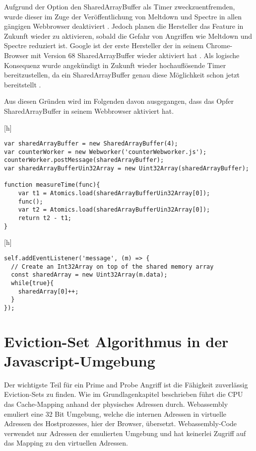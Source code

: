 Aufgrund der Option den SharedArrayBuffer als Timer zweckzuentfremden, wurde dieser im Zuge der Veröffentlichung von Meltdown und Spectre in allen gängigen Webbrowser deaktiviert \cite{FirefoxSharedArrayBuffer}. Jedoch planen die Hersteller das Feature in Zukunft wieder zu aktivieren, sobald die Gefahr von Angriffen wie Meltdown und Spectre reduziert ist. 
Google ist der erste Hersteller der in seinem Chrome-Browser mit Version 68 SharedArrayBuffer wieder aktiviert hat \cite{ChromeSharedArrayBufferAgain}. 
Als logische Konsequenz wurde angekündigt in Zukunft wieder hochauflösende Timer bereitzustellen, da ein SharedArrayBuffer genau diese Möglichkeit schon jetzt bereitstellt \cite{ChromeHighResolutionTimerAgain}.

Aus diesen Gründen wird im Folgenden davon ausgegangen, dass das Opfer SharedArrayBuffer in seinem Webbrowser aktiviert hat.

\label{alg_list:sharedArrayBufferWorkerMain}[h]
\begin{lstlisting}[caption=main.js: Code welcher den counterWorker für Zeitmessungen verwendet]
var sharedArrayBuffer = new SharedArrayBuffer(4);
var counterWorker = new Webworker('counterWebworker.js');
counterWorker.postMessage(sharedArrayBuffer);
var sharedArrayBufferUin32Array = new Uint32Array(sharedArrayBuffer);

function measureTime(func){
    var t1 = Atomics.load(sharedArrayBufferUin32Array[0]);
    func();
    var t2 = Atomics.load(sharedArrayBufferUin32Array[0]);
    return t2 - t1;
}
\end{lstlisting}

\label{alg_list:sharedArrayBufferWorker}[h]
\begin{lstlisting}[caption=counterWebworker.js: Webworker welcher die Zählvariable in einer Endlosschleife iteriert]
self.addEventListener('message', (m) => {
  // Create an Int32Array on top of the shared memory array 
  const sharedArray = new Uint32Array(m.data);
  while{true}{
    sharedArray[0]++;
  }
});
\end{lstlisting}

\section{Eviction-Set Algorithmus in der Javascript-Umgebung}
Der wichtigste Teil für ein Prime and Probe Angriff ist die Fähigkeit zuverlässig Eviction-Sets zu finden. Wie im Grundlagenkapitel beschrieben führt die CPU das Cache-Mapping anhand der physisches Adressen durch. Webassembly emuliert eine 32 Bit Umgebung, welche die internen Adressen in virtuelle Adressen des Hostprozesses, hier der Browser, übersetzt. 
Webassembly-Code verwendet nur Adressen der emulierten Umgebung und hat keinerlei Zugriff auf das Mapping zu den virtuellen Adressen. 

